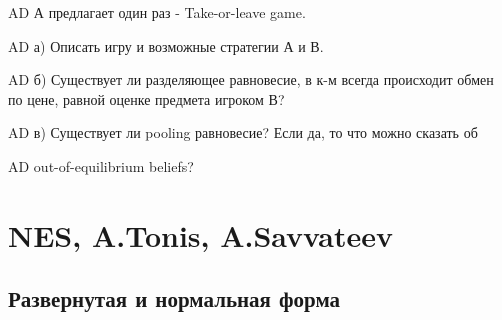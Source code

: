 \documentclass[a4paper,12pt]{article}
\begin{document}
AD А предлагает один раз - Take-or-leave game.

AD а) Описать игру и возможные стратегии А и В.

AD б) Существует ли разделяющее равновесие, в к-м всегда
происходит обмен
 по цене, равной оценке предмета игроком В?

AD в) Существует ли pooling равновесие? Если да, то что
можно сказать об

AD out-of-equilibrium beliefs?

\section{NES, A.Tonis, A.Savvateev}

\subsection{Развернутая и нормальная форма}
\end{document}
